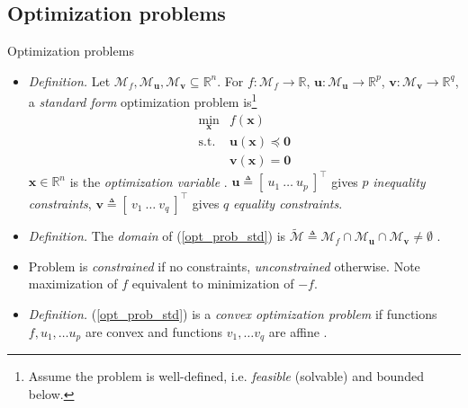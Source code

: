 \documentclass{beamer}
\numberwithin{equation}{section}
\newcommand{\aref}[1]{\alert{\ref{#1}}}
\begin{document}
\subsection{Optimization problems}

\begin{frame}{Optimization problems}
    \begin{itemize}
        \item
        \textit{Definition.} Let $ \mathcal{M}_f, \mathcal{M}_\mathbf{u},
        \mathcal{M}_\mathbf{v} \subseteq \mathbb{R}^n $. For
        $ f: \mathcal{M}_f \rightarrow \mathbb{R} $, $ \mathbf{u} :
        \mathcal{M}_\mathbf{u} \rightarrow \mathbb{R}^p $,
        $ \mathbf{v} : \mathcal{M}_\mathbf{v} \rightarrow \mathbb{R}^q $, a
        \textit{standard form} optimization problem is\footnote{
            Assume the problem is well-defined, i.e. \textit{feasible}
            (solvable) and bounded below.
        }
        \cite{bv_convex_opt}
        \begin{equation} \label{opt_prob_std}
            \begin{array}{ll}
                \displaystyle\min_\mathbf{x} & f(\mathbf{x}) \\
                \text{s.t.} & \mathbf{u}(\mathbf{x}) \preceq \mathbf{0} \\
                & \mathbf{v}(\mathbf{x}) = \mathbf{0}
            \end{array}
        \end{equation}
        $ \mathbf{x} \in \mathbb{R}^n $ is the \textit{optimization
        variable} \cite{bv_convex_opt}. $ \mathbf{u} \triangleq
        [ \ u_1 \ \ldots \ u_p \ ]^\top $ gives $ p $ \textit{inequality
        constraints}, $ \mathbf{v} \triangleq [ \ v_1 \ \ldots \ v_q \ ]^\top $
        gives $ q $ \textit{equality constraints}.

        \item
        \textit{Definition.} The \textit{domain} of (\aref{opt_prob_std}) is
        $ \tilde{\mathcal{M}} \triangleq \mathcal{M}_f \cap
        \mathcal{M}_\mathbf{u} \cap \mathcal{M}_\mathbf{v} \ne \emptyset $
        \cite{bv_convex_opt}.

        \item
        Problem is \textit{constrained} if no constraints,
        \textit{unconstrained} otherwise. Note maximization of $ f $ 
        equivalent to minimization of $ -f $.

        \item
        \textit{Definition.} (\aref{opt_prob_std}) is a
        \textit{convex optimization problem} if functions
        $ f, u_1, \ldots u_p $ are convex and functions $ v_1, \ldots v_q $
        are affine \cite{bv_convex_opt}.
    \end{itemize}

    \medskip
\end{frame}
\end{document}
